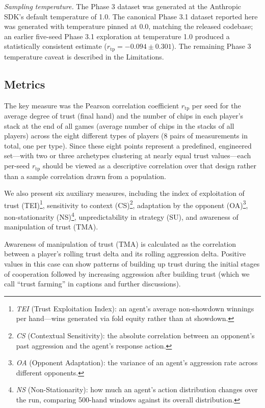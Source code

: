 \documentclass[10pt]{article} %
\newcommand{\rtp}{\ensuremath{r_{\mathrm{tp}}}}
\begin{document}
\textit{Sampling temperature.} The Phase 3 dataset was generated at the Anthropic SDK's default temperature of 1.0. The canonical Phase 3.1 dataset reported here was generated with temperature pinned at 0.0, matching the released codebase; an earlier five-seed Phase 3.1 exploration at temperature 1.0 produced a statistically consistent estimate ($\rtp = -0.094 \pm 0.301$). The remaining Phase 3 temperature caveat is described in the Limitations.

\subsection{Metrics}
The key measure was the Pearson correlation coefficient $\rtp$ per
seed for the average degree of trust (final hand) and the number of
chips in each player's stack at the end of all games (average number
of chips in the stacks of all players) across the eight different
types of players (8 pairs of measurements in total, one per type).
Since these eight points represent a predefined, engineered
set---with two or three archetypes clustering at nearly equal trust
values---each per-seed $\rtp$ should be viewed as a descriptive
correlation over that design rather than a sample correlation drawn
from a population.

We also present six auxiliary measures, including the index of
exploitation of trust (TEI)\footnote{\textit{TEI} (Trust Exploitation Index): an agent's average
non-showdown winnings per hand---wins generated via fold equity
rather than at showdown.},
sensitivity to context (CS)\footnote{\textit{CS} (Contextual Sensitivity): the absolute correlation
between an opponent's past aggression and the agent's response
action.}, adaptation by the opponent
(OA)\footnote{\textit{OA} (Opponent Adaptation): the variance of an agent's
aggression rate across different opponents.},
non-stationarity (NS)\footnote{\textit{NS} (Non-Stationarity): how much an agent's action
distribution changes over the run, comparing 500-hand windows against
its overall distribution.},
unpredictability in strategy (SU), and awareness of manipulation of
trust (TMA).

Awareness of manipulation of trust (TMA) is calculated as the
correlation between a player's rolling trust delta and its rolling
aggression delta. Positive values in this case can show patterns of
building up trust during the initial stages of cooperation followed
by increasing aggression after building trust (which we call ``trust
farming'' in captions and further discussions).
\end{document}
